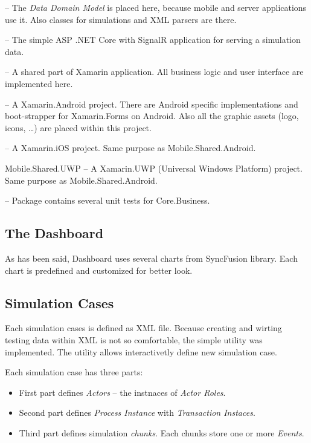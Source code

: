 \begin{description}
\item[Core.Business] -- The \textit{Data Domain Model} is placed here, because mobile and server applications use it. Also classes for simulations and XML parsers are there.
\item[Server] -- The simple ASP .NET Core with SignalR application for serving a simulation data.
\item[Mobile.Shared] -- A shared part of Xamarin application. All business logic and user interface are implemented here.
\item[Mobile.Shared.Android] -- A Xamarin.Android project. There are Android specific implementations and boot-strapper for Xamarin.Forms on Android. Also all the graphic assets (logo, icons, \dots) are placed within this project.
\item[Mobile.Shared.iOS] -- A Xamarin.iOS project. Same purpose as Mobile.Shared.Android.
\item{Mobile.Shared.UWP} -- A Xamarin.UWP (Universal Windows Platform) project. Same purpose as Mobile.Shared.Android.
\item[Tests] -- Package contains several unit tests for Core.Business. 
\end{description}
\subsection{The Dashboard}
As has been said, Dashboard uses several charts from SyncFusion library. Each chart is predefined and customized for better look. 
\subsection{Simulation Cases}
Each simulation cases is defined as XML file. Because creating and wirting testing data within XML is not so comfortable, the simple utility was implemented. The utility allows interactivetly define new simulation case.

Each simulation case has three parts:
\begin{itemize}
\item First part defines \textit{Actors} -- the instnaces of \textit{Actor Roles}.
\item Second part defines \textit{Process Instance} with \textit{Transaction Instaces}.
\item Third part defines simulation \textit{chunks}. Each chunks store one or more \textit{Events}.
\end{itemize}

